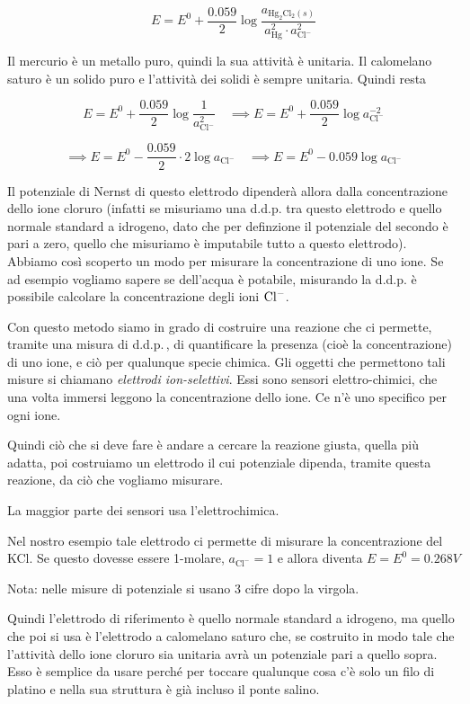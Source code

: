 $$E=E^0 + \frac{0.059}{2} \log \frac{a_{\text{Hg}_2\text{Cl}_2(s)}}{a^2_{\text{Hg}} \cdot a^2_{\text{Cl}^-}}$$

Il mercurio è un metallo puro, quindi la sua attività è unitaria. Il calomelano saturo è un solido puro e l'attività dei solidi è sempre unitaria. Quindi resta

$$E=E^0 + \frac{0.059}{2} \log \frac{1}{a^2_{\text{Cl}^-}}\quad
\implies E=E^0 + \frac{0.059}{2} \log a^{-2}_{\text{Cl}^-}$$

$$\implies E=E^0 - \frac{0.059}{2} \cdot 2 \log a_{\text{Cl}^-}
\quad
\implies E=E^0 - 0.059 \log a_{\text{Cl}^-}$$

Il potenziale di Nernst di questo elettrodo dipenderà allora dalla concentrazione dello ione cloruro (infatti se misuriamo una d.d.p. tra questo elettrodo e quello normale standard a idrogeno, dato che per definzione il potenziale del secondo è pari a zero, quello che misuriamo è imputabile tutto a questo elettrodo). Abbiamo così scoperto un modo per misurare la concentrazione di uno ione. Se ad esempio vogliamo sapere se dell'acqua è potabile, misurando la d.d.p. è possibile calcolare la concentrazione degli ioni $\rm Cl^-$.

Con questo metodo siamo in grado di costruire una reazione che ci permette, tramite una misura di d.d.p.\,, di quantificare la presenza (cioè la concentrazione) di uno ione, e ciò per qualunque specie chimica. Gli oggetti che permettono tali misure si chiamano \textit{elettrodi ion-selettivi}. Essi sono sensori elettro-chimici, che una volta immersi leggono la concentrazione dello ione. Ce n'è uno specifico per ogni ione.

Quindi ciò che si deve fare è andare a cercare la reazione giusta, quella più adatta, poi costruiamo un elettrodo il cui potenziale dipenda, tramite questa reazione, da ciò che vogliamo misurare.

La maggior parte dei sensori usa l'elettrochimica.

Nel nostro esempio tale elettrodo ci permette di misurare la concentrazione del KCl. Se questo dovesse essere 1-molare, $a_{\text{Cl}^-}=1$ e allora diventa $E=E^0=0.268 V$

\vspace{0.2cm}Nota: nelle misure di potenziale si usano 3 cifre dopo la virgola.

\vspace{0.2cm}Quindi l'elettrodo di riferimento è quello normale standard a idrogeno, ma quello che poi si usa è l'elettrodo a calomelano saturo che, se costruito in modo tale che l'attività dello ione cloruro sia unitaria avrà un potenziale pari a quello sopra. Esso è semplice da usare perché per toccare qualunque cosa c'è solo un filo di platino e nella sua struttura è già incluso il ponte salino.

